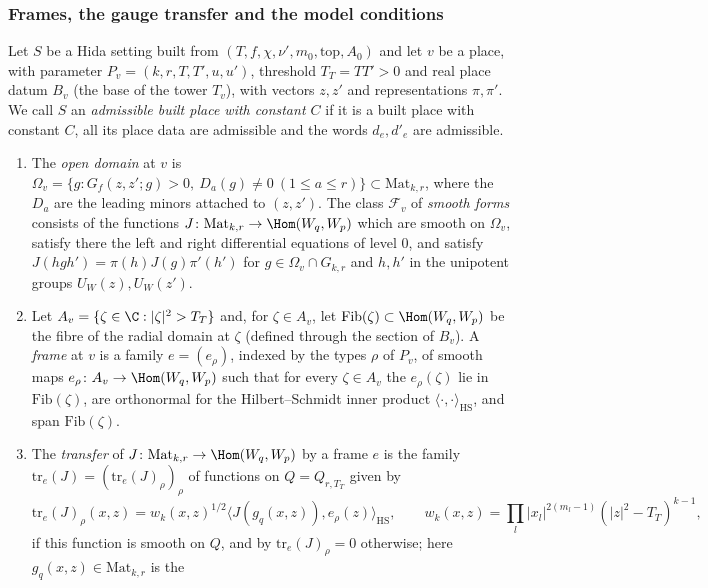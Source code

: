 \subsubsection{Frames, the gauge transfer and the model conditions}

\begin{definition}\label{pf:thmS-carrier:transferdef}
Let $S$ be a Hida setting built from $(T,f,\chi,\nu',m_0,\mathrm{top},A_0)$ and let $v$ be a place, with parameter
$P_v=(k,r,T,T',u,u')$, threshold $T_T=TT'>0$ and real place datum $B_v$ (the base of the tower $T_v$), with vectors $z,z'$
and representations $\pi,\pi'$. We call $S$ an \emph{admissible built place with constant $C$} if it is a built place with
constant $C$, all its place data are admissible and the words $d_e,d'_e$ are admissible.
\begin{enumerate}[label=(\roman*)]
\item The \emph{open domain} at $v$ is $\Omega_v=\{g:G_f(z,z';g)>0,\ D_a(g)\ne0\ (1\le a\le r)\}\subset\mathrm{Mat}_{k,r}$,
  where the $D_a$ are the leading minors attached to $(z,z')$. The class $\mathcal F_v$ of \emph{smooth forms} consists of
  the functions $J\colon\mathrm{Mat}_{k,r}\to\Hom(W_q,W_p)$ which are smooth on $\Omega_v$, satisfy there the left and right
  differential equations of level $0$, and satisfy $J(hgh')=\pi(h)J(g)\pi'(h')$ for $g\in\Omega_v\cap G_{k,r}$ and $h,h'$ in
  the unipotent groups $U_W(z),U_W(z')$.
\item Let $A_v=\{\zeta\in\C:|\zeta|^2>T_T\}$ and, for $\zeta\in A_v$, let $\mathrm{Fib}(\zeta)\subset\Hom(W_q,W_p)$ be the
  fibre of the radial domain at $\zeta$ (defined through the section of $B_v$). A \emph{frame} at $v$ is a family
  $e=(e_\rho)$, indexed by the types $\rho$ of $P_v$, of smooth maps $e_\rho\colon A_v\to\Hom(W_q,W_p)$ such that for every
  $\zeta\in A_v$ the $e_\rho(\zeta)$ lie in $\mathrm{Fib}(\zeta)$, are orthonormal for the Hilbert--Schmidt inner product
  $\langle\cdot,\cdot\rangle_{\mathrm{HS}}$, and span $\mathrm{Fib}(\zeta)$.
\item The \emph{transfer} of $J\colon\mathrm{Mat}_{k,r}\to\Hom(W_q,W_p)$ by a frame $e$ is the family
  $\mathrm{tr}_e(J)=(\mathrm{tr}_e(J)_\rho)_\rho$ of functions on $Q=Q_{r,T_T}$ given by
  \[
  \mathrm{tr}_e(J)_\rho(x,z)=w_k(x,z)^{1/2}\bigl\langle J(g_q(x,z)),e_\rho(z)\bigr\rangle_{\mathrm{HS}},\qquad
  w_k(x,z)=\prod_l|x_l|^{2(m_l-1)}(|z|^2-T_T)^{k-1},
  \]
  if this function is smooth on $Q$, and by $\mathrm{tr}_e(J)_\rho=0$ otherwise; here $g_q(x,z)\in\mathrm{Mat}_{k,r}$ is the

\end{enumerate}
\end{definition}
